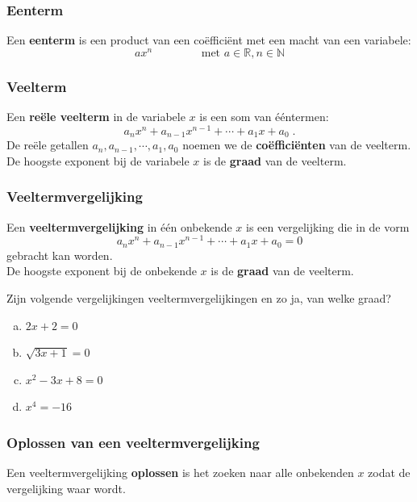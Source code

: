 \documentclass[12pt,twoside,a4paper]{article}
\begin{document}
\subsubsection*{Eenterm}
\begin{mdframed}
Een {\bf eenterm} is een product van een coëfficiënt met een macht van een variabele:
$$ax^n\qquad\qquad\mbox{ met }a\in\mathbb{R}, n\in\mathbb{N}$$
\end{mdframed}

\subsubsection*{Veelterm}
\begin{mdframed}
  Een {\bf reële veelterm} in de variabele $x$ is een som van ééntermen:
  $$ a_nx^n + a_{n-1}x^{n-1} + \cdots + a_1x + a_0 \;.$$
  De reële getallen $a_n, a_{n-1}, \cdots, a_1, a_0$ noemen we de {\bf coëfficiënten} van de veelterm.
  De hoogste exponent bij de variabele $x$ is de {\bf graad} van de veelterm.
\end{mdframed}

\subsubsection*{Veeltermvergelijking}
\begin{mdframed}
  Een {\bf veeltermvergelijking} in één onbekende $x$ is een vergelijking die in de vorm
  $$a_nx^n + a_{n-1}x^{n-1} + \cdots + a_1x + a_0 = 0$$
  gebracht kan worden.\\
  De hoogste exponent bij de onbekende $x$ is de {\bf graad} van de veelterm.
\end{mdframed}

\begin{oefening}
  Zijn volgende vergelijkingen veeltermvergelijkingen en zo ja, van welke graad?
  \begin{multicols}{2}
    \begin{enumerate}[(a)]
      \itemsep.5em
    \item $2x + 2 = 0$
    \item $\sqrt{3x+1} = 0$
    \item $x^2-3x+8=0$
    \item $x^4=-16$
    \end{enumerate}
  \end{multicols}
\end{oefening}

\subsubsection*{Oplossen van een veeltermvergelijking}
\begin{mdframed}
  Een veeltermvergelijking {\bf oplossen} is het zoeken naar alle onbekenden $x$ zodat de vergelijking waar wordt.
\end{mdframed}
\end{document}
